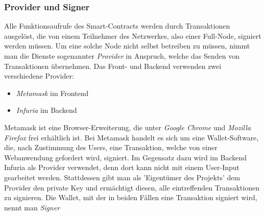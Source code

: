 \subsubsection{Provider und Signer}
Alle Funktionsaufrufe des Smart-Contracts werden durch Transaktionen ausgelöst, die von einem Teilnehmer des Netzwerkes, also einer Full-Node, signiert werden müssen. Um eine solche Node nicht selbst betreiben zu müssen, nimmt man die Dienste sogenannter \emph{Provider} in Anspruch, welche das Senden von Transaktionen übernehmen. Das Front- und Backend verwenden zwei verschiedene Provider:
\begin{itemize}
	\item \emph{Metamask} im Frontend
	\item \emph{Infuria} im Backend
\end{itemize}
Metamask ist eine Browser-Erweiterung, die unter \emph{Google Chrome} und \emph{Mozilla Firefox} frei erhältlich ist. Bei Metamask handelt es sich um eine Wallet-Software, die, nach Zustimmung des Users, eine Transaktion, welche von einer Webanwendung gefordert wird, signiert.
Im Gegensatz dazu wird im Backend Infuria als Provider verwendet, denn dort kann nicht mit einem User-Input gearbeitet werden. Stattdessen gibt man als 'Eigentümer des Projekts' dem Provider den private Key und ermächtigt diesen, alle eintreffenden Transaktionen zu signieren. Die Wallet, mit der in beiden Fällen eine Transaktion signiert wird, nennt man \emph{Signer}
